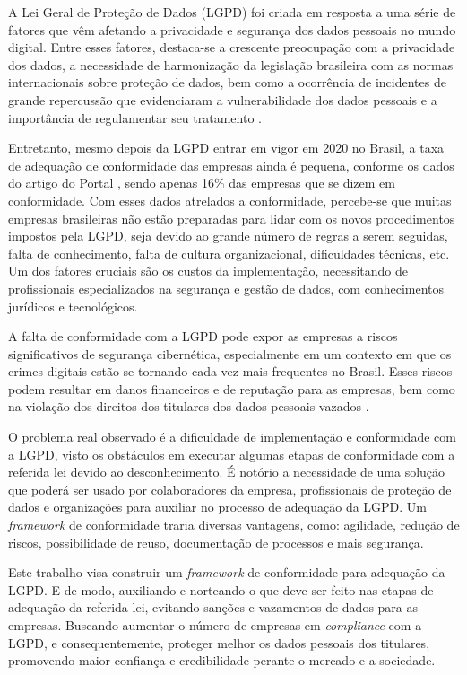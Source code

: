 \documentclass[
	12pt,				%
	openright,			%
	oneside,			%
	a4paper,			%
	english,			%
	french,				%
	spanish,			%
	brazil,				%
	]{abntex2}
\begin{document}
A Lei Geral de Proteção de Dados (LGPD) foi criada em resposta a uma série de fatores que vêm afetando a privacidade e segurança dos dados pessoais no mundo digital. Entre esses fatores, destaca-se a crescente preocupação com a privacidade dos dados, a necessidade de harmonização da legislação brasileira com as normas internacionais sobre proteção de dados, bem como a ocorrência de incidentes de grande repercussão que evidenciaram a vulnerabilidade dos dados pessoais e a importância de regulamentar seu tratamento \cite{01-02-Senado}.

Entretanto, mesmo depois da LGPD entrar em vigor em 2020 no Brasil, a taxa de adequação de conformidade das empresas ainda é pequena, conforme os dados do artigo do Portal , sendo apenas 16\% das empresas que se dizem em conformidade. Com esses dados atrelados a conformidade, percebe-se que muitas empresas brasileiras não estão preparadas para lidar com os novos procedimentos impostos pela LGPD, seja devido ao grande número de regras a serem seguidas, falta de conhecimento, falta de cultura organizacional, dificuldades técnicas, etc. Um dos fatores cruciais são os custos da implementação, necessitando de profissionais especializados na segurança e gestão de dados, com conhecimentos jurídicos e tecnológicos. 

A falta de conformidade com a LGPD pode expor as empresas a riscos significativos de segurança cibernética, especialmente em um contexto em que os crimes digitais estão se tornando cada vez mais frequentes no Brasil. Esses riscos podem resultar em danos financeiros e de reputação para as empresas, bem como na violação dos direitos dos titulares dos dados pessoais vazados  \cite{Diogo2021}.


O problema real observado é a dificuldade de implementação e conformidade com a LGPD, visto os obstáculos em executar algumas etapas de conformidade com a referida lei devido ao desconhecimento. É notório a necessidade de uma solução que poderá ser usado por colaboradores da empresa, profissionais de proteção de dados e organizações para auxiliar no processo de adequação da LGPD. Um \textit{framework} de conformidade traria diversas vantagens, como: agilidade, redução de riscos, possibilidade de reuso, documentação de processos e mais segurança.

Este trabalho visa construir um \textit{framework} de conformidade para adequação da LGPD. E de modo, auxiliando e norteando o que deve ser feito nas etapas de adequação da referida lei, evitando sanções e vazamentos de dados para as empresas. Buscando aumentar o número de empresas em \textit{compliance} com a LGPD, e consequentemente, proteger melhor os dados pessoais dos titulares, promovendo maior confiança e credibilidade perante o mercado e a sociedade.
\end{document}
